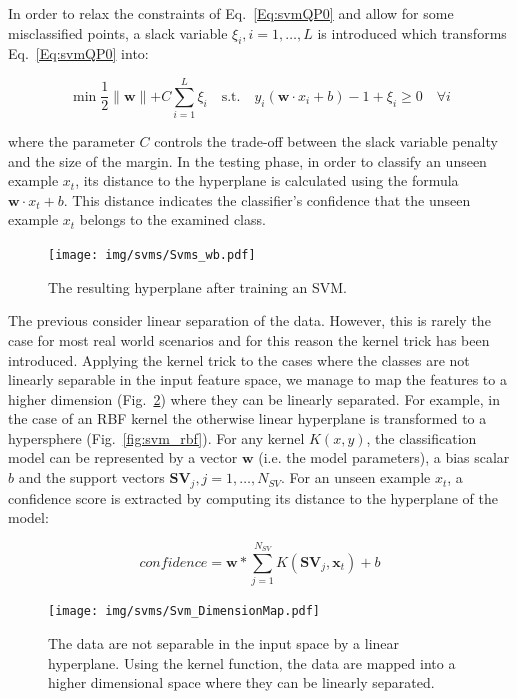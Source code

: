 In order to relax the constraints of Eq.~\ref{Eq:svmQP0} and allow for
some misclassified points, a slack variable $\xi_i, i=1,\ldots,L$ is
introduced which transforms Eq.~\ref{Eq:svmQP0} into:

\begin{equation}\label{Eq:svmQPxi}
  \min \frac{1}{2}\parallel\mathbf{w}\parallel + C\sum_{i=1}^{L}\xi_i \quad \text{s.t.} \quad y_i(\mathbf{w}\cdot x_i + b) -1 +\xi_i \ge 0 \quad \forall i
\end{equation}

\noindent where the parameter $C$ controls the trade-off between the
slack variable penalty and the size of the margin. In the testing
phase, in order to classify an unseen example $x_t$, its distance to
the hyperplane is calculated using the formula $\mathbf{w}\cdot x_t +
b$. This distance indicates the classifier's confidence that the
unseen example $x_t$ belongs to the examined class.

\begin{figure}[h]
\centering
  \texttt{[image: img/svms/Svms\_wb.pdf]}
  \caption{The resulting hyperplane after training an SVM.}
  \label{fig:svm_wb}
\end{figure}

The previous consider linear separation of the data. However, this is
rarely the case for most real world scenarios and for this reason the
kernel trick has been introduced. Applying the kernel trick to the
cases where the classes are not linearly separable in the input
feature space, we manage to map the features to a higher dimension
(Fig.~\ref{fig:svm_highDim}) where they can be linearly separated. For
example, in the case of an RBF kernel the otherwise linear hyperplane
is transformed to a hypersphere (Fig.~\ref{fig:svm_rbf}). For any
kernel $K(x,y)$, the classification model can be represented by a
vector $\textbf{w}$ (i.e. the model parameters), a bias scalar $b$ and
the support vectors $\mathbf{SV}_j, j=1,\ldots,N_{SV}$. For an unseen
example $x_t$, a confidence score is extracted by computing its
distance to the hyperplane of the model:

\begin{equation}\label{Eq:SVMdecision}
  confidence = \mathbf{w}*\sum_{j=1}^{N_{SV}}{K(\mathbf{SV}_j,\mathbf{x}_t)}+b
\end{equation}

\begin{figure}[h]
\centering
  \texttt{[image: img/svms/Svm\_DimensionMap.pdf]}
  \caption{The data are not separable in the input space by a linear hyperplane. Using the kernel function, the data are mapped into a higher dimensional space where they can be linearly separated.}
  \label{fig:svm_highDim}
\end{figure}

